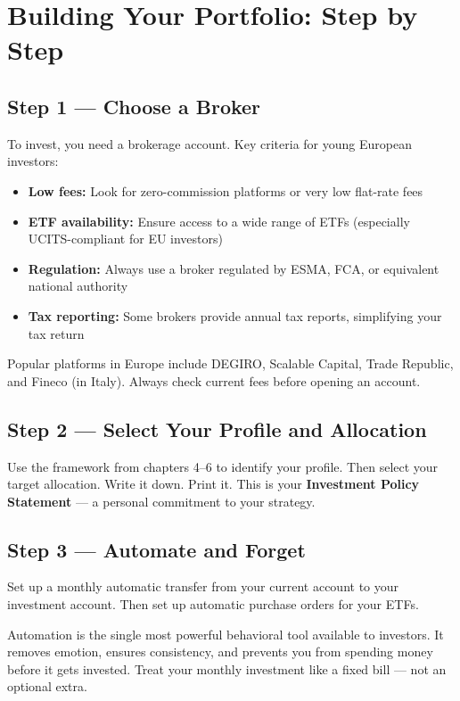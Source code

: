 \documentclass[12pt, a4paper]{book}
\begin{document}
\chapter{Building Your Portfolio: Step by Step}

\section{Step 1 --- Choose a Broker}

To invest, you need a brokerage account. Key criteria for young European investors:

\begin{itemize}[leftmargin=1.5cm]
  \item \textbf{Low fees:} Look for zero-commission platforms or very low flat-rate fees
  \item \textbf{ETF availability:} Ensure access to a wide range of ETFs (especially UCITS-compliant for EU investors)
  \item \textbf{Regulation:} Always use a broker regulated by ESMA, FCA, or equivalent national authority
  \item \textbf{Tax reporting:} Some brokers provide annual tax reports, simplifying your tax return
\end{itemize}

Popular platforms in Europe include DEGIRO, Scalable Capital, Trade Republic, and Fineco (in Italy). Always check current fees before opening an account.

\section{Step 2 --- Select Your Profile and Allocation}

Use the framework from chapters 4--6 to identify your profile. Then select your target allocation. Write it down. Print it. This is your \textbf{Investment Policy Statement} --- a personal commitment to your strategy.

\section{Step 3 --- Automate and Forget}

Set up a monthly automatic transfer from your current account to your investment account. Then set up automatic purchase orders for your ETFs.

\begin{tipbox}
Automation is the single most powerful behavioral tool available to investors. It removes emotion, ensures consistency, and prevents you from spending money before it gets invested. Treat your monthly investment like a fixed bill --- not an optional extra.
\end{tipbox}
\end{document}
